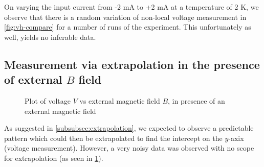 On varying the input current from -2 mA to +2 mA at a temperature of 2 K, we observe that there is a random variation of non-local voltage measurement in \cref{fig:vh-compare} for a number of runs of the experiment. This unfortunately as well, yields no inferable data.

\subsection{Measurement via extrapolation in the presence of external \( B \) field}

\begin{figure}
    
    \caption{Plot of voltage \( V \) vs external magnetic field \( B \), in presence of an external magnetic field}
    \label{fig:b-extrapolation}
\end{figure}

As suggested in \cref{subsubsec:extrapolation}, we expected to observe a predictable pattern which could then be extrapolated to find the intercept on the \( y \)-axix (voltage measurement).
However, a very noisy data was observed with no scope for extrapolation (as seen in \cref{fig:b-extrapolation}).
